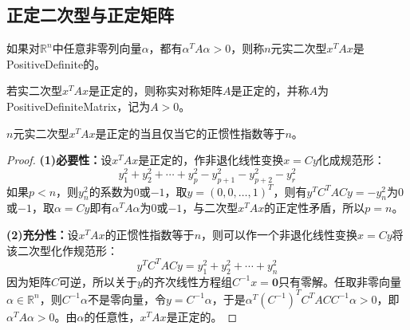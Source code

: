 \subsection{正定二次型与正定矩阵}
\begin{definition}
	如果对$\mathbb{R}^{n}$中任意非零列向量$\alpha$，都有$\alpha^TA\alpha>0$，则称$n$元实二次型$x^TAx$是\gls{PositiveDefinite}的。
\end{definition}
\begin{definition}
	若实二次型$x^TAx$是正定的，则称实对称矩阵$A$是正定的，并称$A$为\gls{PositiveDefiniteMatrix}，记为$A>0$。
\end{definition}
\begin{theorem}
	$n$元实二次型$x^TAx$是正定的当且仅当它的正惯性指数等于$n$。
\end{theorem}
\begin{proof}
	\textbf{(1)必要性：}设$x^TAx$是正定的，作非退化线性变换$x=Cy$化成规范形：
	\begin{equation*}
		y_1^2+y_2^2+\cdots+y_p^2-y_{p+1}^2-y_{p+2}^2-y_r^2
	\end{equation*}
	如果$p<n$，则$y_n^2$的系数为$0$或$-1$，取$y=(0,0,\dots,1)^T$，则有$y^TC^TACy=-y_n^2$为$0$或$-1$，取$\alpha=Cy$即有$\alpha^TA\alpha$为$0$或$-1$，与二次型$x^TAx$的正定性矛盾，所以$p=n$。\par
	\textbf{(2)充分性：}设$x^TAx$的正惯性指数等于$n$，则可以作一个非退化线性变换$x=Cy$将该二次型化作规范形：
	\begin{equation*}
		y^TC^TACy=y_1^2+y_2^2+\cdots+y_n^2
	\end{equation*}
	因为矩阵$C$可逆，所以关于$y$的齐次线性方程组$C^{-1}x=\mathbf{0}$只有零解。任取非零向量$\alpha\in\mathbb{R}^{n}$，则$C^{-1}\alpha$不是零向量，令$y=C^{-1}\alpha$，于是$\alpha^T(C^{-1})^TC^TACC^{-1}\alpha>0$，即$\alpha^TA\alpha>0$。由$\alpha$的任意性，$x^TAx$是正定的。
\end{proof}
